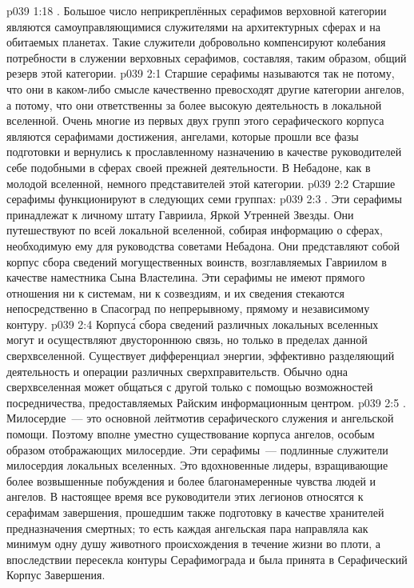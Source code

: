 \vs p039 1:18 . Большое число неприкреплённых серафимов верховной категории являются самоуправляющимися служителями на архитектурных сферах и на обитаемых планетах. Такие служители добровольно компенсируют колебания потребности в служении верховных серафимов, составляя, таким образом, общий резерв этой категории.
\vs p039 2:1 Старшие серафимы называются так не потому, что они в каком\hyp{}либо смысле качественно превосходят другие категории ангелов, а потому, что они ответственны за более высокую деятельность в локальной вселенной. Очень многие из первых двух групп этого серафического корпуса являются серафимами достижения, ангелами, которые прошли все фазы подготовки и вернулись к прославленному назначению в качестве руководителей себе подобными в сферах своей прежней деятельности. В Небадоне, как в молодой вселенной, немного представителей этой категории.
\vs p039 2:2 Старшие серафимы функционируют в следующих семи группах:
\vs p039 2:3 . Эти серафимы принадлежат к личному штату Гавриила, Яркой Утренней Звезды. Они путешествуют по всей локальной вселенной, собирая информацию о сферах, необходимую ему для руководства советами Небадона. Они представляют собой корпус сбора сведений могущественных воинств, возглавляемых Гавриилом в качестве наместника Сына Властелина. Эти серафимы не имеют прямого отношения ни к системам, ни к созвездиям, и их сведения стекаются непосредственно в Спасоград по непрерывному, прямому и независимому контуру.
\vs p039 2:4 Корпус\'а сбора сведений различных локальных вселенных могут и осуществляют двустороннюю связь, но только в пределах данной сверхвселенной. Существует дифференциал энергии, эффективно разделяющий деятельность и операции различных сверхправительств. Обычно одна сверхвселенная может общаться с другой только с помощью возможностей посредничества, предоставляемых Райским информационным центром.
\vs p039 2:5 . Милосердие~--- это основной лейтмотив серафического служения и ангельской помощи. Поэтому вполне уместно существование корпуса ангелов, особым образом отображающих милосердие. Эти серафимы~--- подлинные служители милосердия локальных вселенных. Это вдохновенные лидеры, взращивающие более возвышенные побуждения и более благонамеренные чувства людей и ангелов. В настоящее время все руководители этих легионов относятся к серафимам завершения, прошедшим также подготовку в качестве хранителей предназначения смертных; то есть каждая ангельская пара направляла как минимум одну душу животного происхождения в течение жизни во плоти, а впоследствии пересекла контуры Серафимограда и была принята в Серафический Корпус Завершения.
